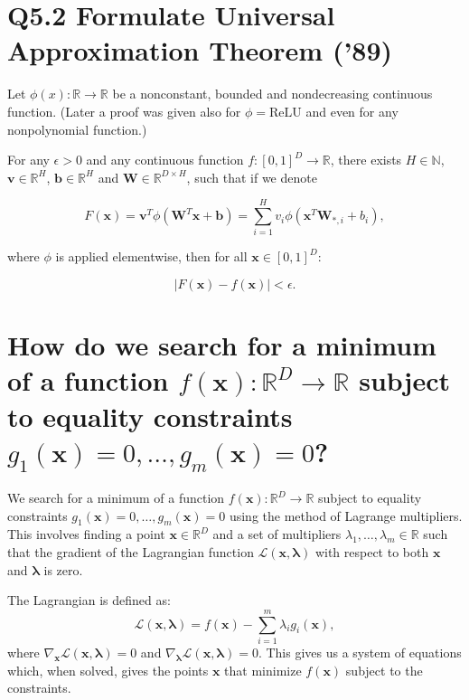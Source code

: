 \documentclass[11pt]{article}
\begin{document}
\section*{Q5.2 Formulate Universal Approximation Theorem ('89)}

Let \(\phi(x) : \mathbb{R} \rightarrow \mathbb{R}\) be a nonconstant, bounded and nondecreasing continuous function. (Later a proof was given also for \(\phi = \text{ReLU}\) and even for any nonpolynomial function.)

For any \(\epsilon > 0\) and any continuous function \(f : [0, 1]^D \rightarrow \mathbb{R}\), there exists \(H \in \mathbb{N}\), \(\mathbf{v} \in \mathbb{R}^H\), \(\mathbf{b} \in \mathbb{R}^H\) and \(\mathbf{W} \in \mathbb{R}^{D \times H}\), such that if we denote

\[
F(\mathbf{x}) = \mathbf{v}^T \phi(\mathbf{W}^T \mathbf{x} + \mathbf{b}) = \sum_{i=1}^{H} v_i \phi(\mathbf{x}^T \mathbf{W}_{*,i} + b_i),
\]

where \(\phi\) is applied elementwise, then for all \(\mathbf{x} \in [0, 1]^D\):

\[
\left| F(\mathbf{x}) - f(\mathbf{x}) \right| < \epsilon.
\]

\section{How do we search for a minimum of a function $f(\mathbf{x}) : \mathbb{R}^D \rightarrow \mathbb{R}$ subject to equality constraints $g_1(\mathbf{x}) = 0, \ldots, g_m(\mathbf{x}) = 0$?}

We search for a minimum of a function $f(\mathbf{x}) : \mathbb{R}^D \rightarrow \mathbb{R}$ subject to equality constraints $g_1(\mathbf{x}) = 0, \ldots, g_m(\mathbf{x}) = 0$ using the method of Lagrange multipliers. This involves finding a point $\mathbf{x} \in \mathbb{R}^D$ and a set of multipliers $\lambda_1, \ldots, \lambda_m \in \mathbb{R}$ such that the gradient of the Lagrangian function $\mathcal{L}(\mathbf{x}, \mathbf{\lambda})$ with respect to both $\mathbf{x}$ and $\mathbf{\lambda}$ is zero.

The Lagrangian is defined as:
\[
\mathcal{L}(\mathbf{x}, \mathbf{\lambda}) = f(\mathbf{x}) - \sum_{i=1}^{m} \lambda_i g_i(\mathbf{x}),
\]
where $\nabla_{\mathbf{x}}\mathcal{L}(\mathbf{x}, \mathbf{\lambda}) = 0$ and $\nabla_{\mathbf{\lambda}}\mathcal{L}(\mathbf{x}, \mathbf{\lambda}) = 0$. This gives us a system of equations which, when solved, gives the points $\mathbf{x}$ that minimize $f(\mathbf{x})$ subject to the constraints.
\end{document}
